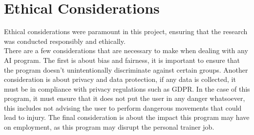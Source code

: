 \section{Ethical Considerations}
    Ethical considerations were paramount in this project, ensuring that the research was conducted responsibly and ethically.\\
    There are a few considerations that are necessary to make when dealing with any AI program. The first is about bias and fairness, it is important to ensure that the program doesn't unintentionally discriminate against certain groups. Another consideration is about privacy and data protection, if any data is collected, it must be in compliance with privacy regulations such as GDPR. In the case of this program, it must ensure that it does not put the user in any danger whatsoever, this includes not advising the user to perform dangerous movements that could lead to injury. The final consideration is about the impact this program may have on employment, as this program may disrupt the personal trainer job.
    
